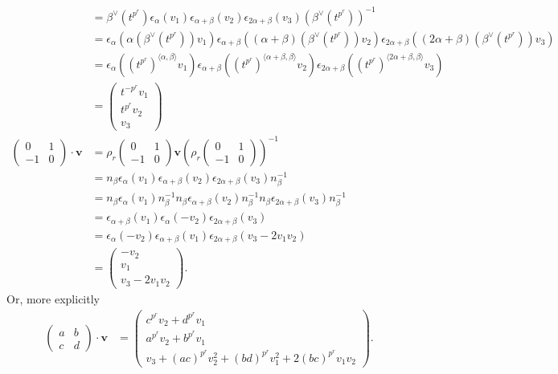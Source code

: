 \begin{align*}
																					 &= \beta^\vee(t^{p^r}) \epsilon_\alpha (v_1)
\epsilon_{\alpha+\beta}(v_2)
	\epsilon_{2\alpha+\beta}(v_3) (\beta^\vee(t^{p^r}))^{-1} \\
		&= \epsilon_\alpha \left(\alpha(\beta^\vee(t^{p^r}))v_1\right)
\epsilon_{\alpha+\beta} \left((\alpha+\beta)(\beta^\vee(t^{p^r}))v_2 \right)
	\epsilon_{2\alpha+\beta} \left((2\alpha+\beta)(\beta^\vee(t^{p^r}))v_3 \right)\\
		&= \epsilon_\alpha \left((t^{p^r})^{\langle \alpha, \beta \rangle}v_1 \right)
\epsilon_{\alpha+\beta} \left((t^{p^r})^{\langle \alpha+\beta, \beta \rangle}v_2 \right)
	\epsilon_{2\alpha+\beta} \left((t^{p^r})^{\langle 2\alpha+\beta, \beta \rangle}v_3 \right)\\
		&= \left(\begin{matrix} t^{-p^r}v_1 \\ t^{p^r}v_2\\ v_3 \end{matrix}\right) \\
		\left(\begin{matrix} 0 & 1 \\ -1 & 0 \end{matrix}\right) \cdot \mathbf{v} &=
		\rho_r\left(\begin{matrix} 0 & 1 \\ -1 & 0\end{matrix}\right) \mathbf{v}\left( \rho_r\left(\begin{matrix} 0 & 1 \\ -1 & 0\end{matrix}\right)\right)^{-1} \\
			&= n_\beta  \epsilon_\alpha (v_1)\epsilon_{\alpha+\beta}(v_2) \epsilon_{2\alpha+\beta}(v_3) n_\beta^{-1}\\
			&= n_\beta  \epsilon_\alpha (v_1) n_\beta^{-1}n_\beta \epsilon_{\alpha+\beta}(v_2) n_\beta^{-1} n_\beta \epsilon_{2\alpha+\beta}(v_3) n_\beta^{-1}\\
			&= \epsilon_{\alpha+\beta} (v_1) \epsilon_{\alpha}(-v_2)  \epsilon_{2\alpha+\beta}(v_3) \\
			&=\epsilon_{\alpha}(-v_2)  \epsilon_{\alpha+\beta} (v_1)  \epsilon_{2\alpha+\beta}(v_3 - 2v_1v_2) \\
			&= \left(\begin{matrix} -v_2 \\ v_1 \\ v_3 - 2v_1v_2 \end{matrix}\right).
			\end{align*}
			Or, more explicitly
			\begin{align*}
			\left(\begin{matrix}
					a & b \\ c & d
					\end{matrix} \right) \cdot \mathbf{v} &=
			\left(\begin{matrix}
					c^{p^r}v_2 + d^{p^r}v_1 \\
					a^{p^r}v_2 + b^{p^r}v_1 \\
					v_3 + (ac)^{p^r}v_2^2 + (bd)^{p^r}v_1^2 + 2(bc)^{p^r}v_1v_2
					\end{matrix}\right).
			\end{align*}

